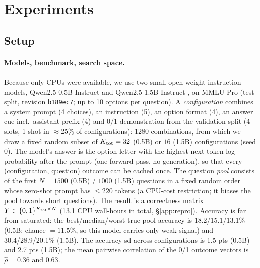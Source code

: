 \section{Experiments}\label{sec:exp}

\subsection{Setup}\label{sec:setup}
\paragraph{Models, benchmark, search space.}
Because only CPUs were available, we use two small open-weight instruction models, Qwen2.5-0.5B-Instruct and Qwen2.5-1.5B-Instruct \citep{qwen2024qwen25}, on MMLU-Pro \citep{wang2024mmlupro} (test split, revision \texttt{b189ec7}; up to 10 options per question).
A \emph{configuration} combines a system prompt (4 choices), an instruction (5), an option format (4), an answer cue incl.\ assistant prefix (4) and 0/1 demonstration from the validation split (4 slots, 1-shot in $\approx$25\% of configurations): 1280 combinations, from which we draw a fixed random subset of $K_{\rm tot}=32$ (0.5B) or $16$ (1.5B) configurations (seed 0).
The model's answer is the option letter with the highest next-token log-probability after the prompt (one forward pass, no generation), so that every (configuration, question) outcome can be cached once.
The question \emph{pool} consists of the first $N=1500$ (0.5B) / $1000$ (1.5B) questions in a fixed random order whose zero-shot prompt has $\le220$ tokens (a CPU-cost restriction; it biases the pool towards short questions).
The result is a correctness matrix $Y\in\{0,1\}^{K_{\rm tot}\times N}$ (13.1 CPU wall-hours in total, \S\ref{app:repro}).
Accuracy is far from saturated: the best/median/worst true pool accuracy is 18.2/15.1/13.1\% (0.5B; chance $=11.5\%$, so this model carries only weak signal) and 30.4/28.9/20.1\% (1.5B). The accuracy sd across configurations is 1.5 pts (0.5B) and 2.7 pts (1.5B); the mean pairwise correlation of the 0/1 outcome vectors is $\hat\rho=0.36$ and $0.63$.

